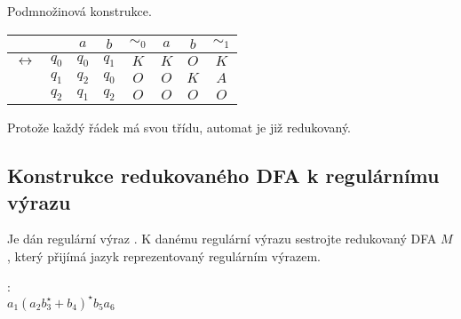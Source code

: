 \newpage

Podmnožinová konstrukce.

\begin{tabular}{|r r|c c||c|c c||c|}
    \hline
    &  & $a$ & $b$ & $\sim_0$ & $a$ & $b$ & $\sim_1$ \\ \hline \hline
    $\leftrightarrow$&$q_0$ & $q_0$ & $q_1$ & $K$ & $K$ & $O$ & $K$\\
                    & $q_1$ & $q_2$ & $q_0$ & $O$ & $O$ & $K$ & $A$\\
                    & $q_2$ & $q_1$ & $q_2$ & $O$ & $O$ & $O$ & $O$\\
    \hline
\end{tabular} 

Protože každý řádek má svou třídu, automat je již redukovaný.

\subsection{Konstrukce redukovaného DFA k regulárnímu výrazu}
Je dán regulární výraz . K danému regulární výrazu sestrojte redukovaný DFA $M$,
který přijímá jazyk reprezentovaný regulárním výrazem.

: \\$a_1(a_2 b_3^{\star} + b_4)^{\star} b_5 a_6$

